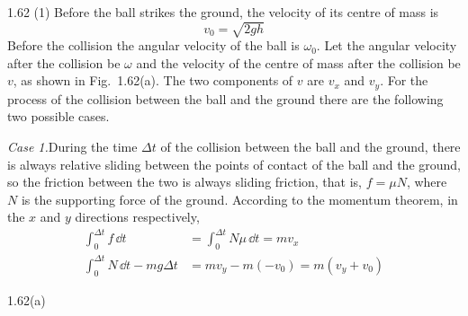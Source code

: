 \begin{solution}{1.62}
(1) Before the ball strikes the ground, the velocity of its centre of mass is
\begin{equation}
v_0=\sqrt{2gh} \tag{1}
\end{equation}
Before the collision the angular velocity of the ball is $\omega_0$. Let the angular velocity after the collision be $\omega$ and the velocity of the centre of mass after the collision be $v$, as shown in Fig.~1.62(a). The two components of $v$ are $v_x$ and $v_y$. For the process of the collision between the ball and the ground there are the following two possible cases.

\textit{Case 1.}\quad During the time $\Delta t$ of the collision between the ball and the ground, there is always relative sliding between the points of contact of the ball and the ground, so the friction between the two is always sliding friction, that is, $f=\mu N$, where $N$ is the supporting force of the ground. According to the momentum theorem, in the $x$ and $y$ directions respectively,
\begin{align}
\int_0^{\Delta t}f\,\dd t&=\int_0^{\Delta t}N\mu\,\dd t=mv_x \tag{2}\\
\int_0^{\Delta t}N\,\dd t-mg\Delta t&=mv_y-m(-v_0)=m\left(v_y+v_0\right) \tag{3}
\end{align}

\begin{figbox}{1.62(a)}
\end{figbox}


\end{solution}
